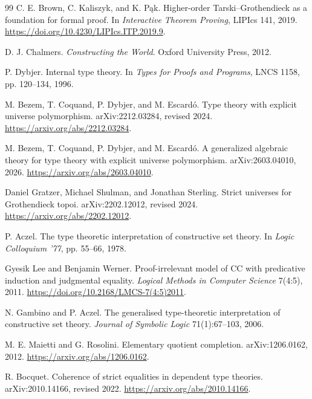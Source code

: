 \documentclass[11pt]{article}
\theoremstyle{definition}
\theoremstyle{remark}
\begin{document}
\begin{thebibliography}{99}
C. E. Brown, C. Kaliszyk, and K. P\k{a}k.
\newblock Higher-order Tarski--Grothendieck as a foundation for formal proof.
\newblock In \emph{Interactive Theorem Proving}, LIPIcs 141, 2019.
\newblock \url{https://doi.org/10.4230/LIPIcs.ITP.2019.9}.

D. J. Chalmers.
\newblock \emph{Constructing the World}.
\newblock Oxford University Press, 2012.

P. Dybjer.
\newblock Internal type theory.
\newblock In \emph{Types for Proofs and Programs}, LNCS 1158,
  pp. 120--134, 1996.

M. Bezem, T. Coquand, P. Dybjer, and M. Escard\'o.
\newblock Type theory with explicit universe polymorphism.
\newblock arXiv:2212.03284, revised 2024.
\newblock \url{https://arxiv.org/abs/2212.03284}.

M. Bezem, T. Coquand, P. Dybjer, and M. Escard\'o.
\newblock A generalized algebraic theory for type theory with explicit
  universe polymorphism.
\newblock arXiv:2603.04010, 2026.
\newblock \url{https://arxiv.org/abs/2603.04010}.

Daniel Gratzer, Michael Shulman, and Jonathan Sterling.
\newblock Strict universes for Grothendieck topoi.
\newblock arXiv:2202.12012, revised 2024.
\newblock \url{https://arxiv.org/abs/2202.12012}.

P. Aczel.
\newblock The type theoretic interpretation of constructive set theory.
\newblock In \emph{Logic Colloquium '77}, pp. 55--66, 1978.

Gyesik Lee and Benjamin Werner.
\newblock Proof-irrelevant model of CC with predicative induction and
  judgmental equality.
\newblock \emph{Logical Methods in Computer Science} 7(4:5), 2011.
\newblock \url{https://doi.org/10.2168/LMCS-7(4:5)2011}.

N. Gambino and P. Aczel.
\newblock The generalised type-theoretic interpretation of constructive set
  theory.
\newblock \emph{Journal of Symbolic Logic} 71(1):67--103, 2006.

M. E. Maietti and G. Rosolini.
\newblock Elementary quotient completion.
\newblock arXiv:1206.0162, 2012.
\newblock \url{https://arxiv.org/abs/1206.0162}.

R. Bocquet.
\newblock Coherence of strict equalities in dependent type theories.
\newblock arXiv:2010.14166, revised 2022.
\newblock \url{https://arxiv.org/abs/2010.14166}.


\end{thebibliography}
\end{document}

